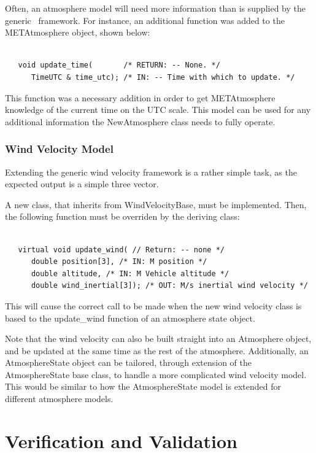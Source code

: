 Often, an atmosphere model will need more information than is supplied by the
generic \atmosphereDesc\ framework. For instance, an additional function was
added to the METAtmosphere object, shown below:

\begin{verbatim}

   void update_time(       /* RETURN: -- None. */
      TimeUTC & time_utc); /* IN: -- Time with which to update. */

\end{verbatim}

This function was a necessary addition in order to get METAtmosphere knowledge of
the current time on the UTC scale. This model can be used for any additional
information the NewAtmosphere class needs to fully operate.


\subsection{Wind Velocity Model}

Extending the generic wind velocity framework is a rather simple task,
as the expected output is a simple three vector.

A new class, that inherits from WindVelocityBase, must be implemented.
Then, the following function must be overriden by the deriving class:

\begin{verbatim}

   virtual void update_wind( // Return: -- none */
      double position[3], /* IN: M position */
      double altitude, /* IN: M Vehicle altitude */
      double wind_inertial[3]); /* OUT: M/s inertial wind velocity */

\end{verbatim}

This will cause the correct call to be made when the new wind velocity
class is based to the update\_wind function of an atmosphere state object.

Note that the wind velocity can also be built straight into an Atmosphere
object, and be updated at the same time as the rest of the atmosphere.
Additionally, an AtmosphereState object can be tailored, through
extension of the AtmosphereState base class, to handle a more complicated
wind velocity model. This would be similar to how the AtmosphereState
model is extended for different atmosphere models.


\chapter{Verification and Validation}\label{ch:ivv}

